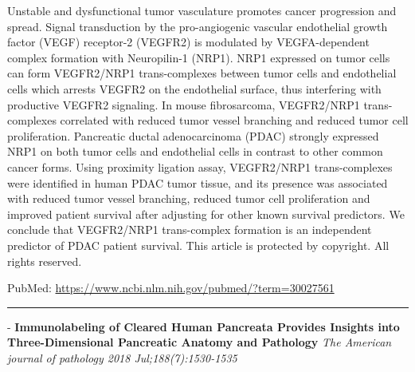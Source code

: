 \documentclass[]{article}
\begin{document}
Unstable and dysfunctional tumor vasculature promotes cancer progression
and spread. Signal transduction by the pro-angiogenic vascular
endothelial growth factor (VEGF) receptor-2 (VEGFR2) is modulated by
VEGFA-dependent complex formation with Neuropilin-1 (NRP1). NRP1
expressed on tumor cells can form VEGFR2/NRP1 trans-complexes between
tumor cells and endothelial cells which arrests VEGFR2 on the
endothelial surface, thus interfering with productive VEGFR2 signaling.
In mouse fibrosarcoma, VEGFR2/NRP1 trans-complexes correlated with
reduced tumor vessel branching and reduced tumor cell proliferation.
Pancreatic ductal adenocarcinoma (PDAC) strongly expressed NRP1 on both
tumor cells and endothelial cells in contrast to other common cancer
forms. Using proximity ligation assay, VEGFR2/NRP1 trans-complexes were
identified in human PDAC tumor tissue, and its presence was associated
with reduced tumor vessel branching, reduced tumor cell proliferation
and improved patient survival after adjusting for other known survival
predictors. We conclude that VEGFR2/NRP1 trans-complex formation is an
independent predictor of PDAC patient survival. This article is
protected by copyright. All rights reserved.

PubMed: \url{https://www.ncbi.nlm.nih.gov/pubmed/?term=30027561}

{}

{}

\begin{center}\rule{0.5\linewidth}{\linethickness}\end{center}

 - \textbf{Immunolabeling of Cleared Human Pancreata Provides Insights
into Three-Dimensional Pancreatic Anatomy and Pathology} \emph{The
American journal of pathology 2018 Jul;188(7):1530-1535}
\end{document}
